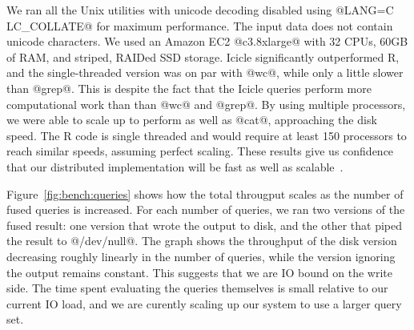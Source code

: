 We ran all the Unix utilities with unicode decoding disabled using @LANG=C LC_COLLATE@ for maximum performance. The input data does not contain unicode characters. 
We used an Amazon EC2 @c3.8xlarge@ with 32 CPUs, 60GB of RAM, and striped, RAIDed SSD storage. Icicle significantly outperformed R, and the single-threaded version was on par with @wc@, while only a little slower than @grep@. This is despite the fact that the Icicle queries perform more computational work than than @wc@ and @grep@. By using multiple processors, we were able to scale up to perform as well as @cat@, approaching the disk speed.
The R code is single threaded and would require at least 150 processors to reach similar speeds, assuming perfect scaling.
These results give us confidence that our distributed implementation will be fast as well as scalable~\cite{mcsherry2015scalability}.









Figure~\ref{fig:bench:queries} shows how the total througput scales as the number of fused queries is increased. For each number of queries, we ran two versions of the fused result: one version that wrote the output to disk, and the other that piped the result to @/dev/null@. The graph shows the throughput of the disk version decreasing roughly linearly in the number of queries, while the version ignoring the output remains constant. This suggests that we are IO bound on the write side. The time spent evaluating the queries themselves is small relative to our current IO load, and we are curently scaling up our system to use a larger query set.

